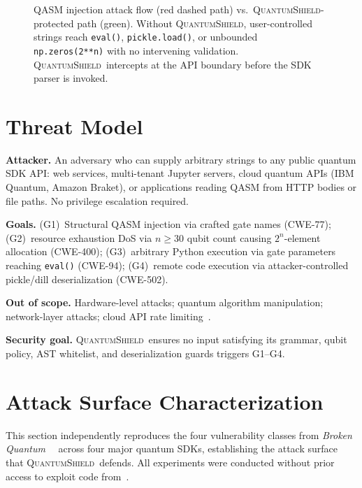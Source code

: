 \documentclass[conference,compsoc]{IEEEtran}
\newcommand{\tool}{\textsc{QuantumShield}}
\newcommand{\broken}{\textit{Broken Quantum}~\cite{blain2026broken}}
\begin{document}
\begin{figure}[!ht]
{}
\caption{QASM injection attack flow (red dashed path) vs.\ \tool-protected
  path (green). Without \tool, user-controlled strings reach
  \texttt{eval()}, \texttt{pickle.load()}, or unbounded
  \texttt{np.zeros(2**n)} with no intervening validation.
  \tool\ intercepts at the API boundary before the SDK parser is invoked.}
\label{fig:attack_flow}
\end{figure}

\section{Threat Model}
\label{sec:threat}
\noindent \textbf{Attacker.}
An adversary who can supply arbitrary strings to any public quantum SDK
API: web services, multi-tenant Jupyter servers, cloud quantum APIs
(IBM Quantum, Amazon Braket), or applications reading QASM from HTTP
bodies or file paths.
No privilege escalation required.

\noindent \textbf{Goals.}
(G1)~Structural QASM injection via crafted gate names (CWE-77);
(G2)~resource exhaustion DoS via $n\!\geq\!30$ qubit count
causing $2^n$-element allocation (CWE-400);
(G3)~arbitrary Python execution via gate parameters reaching
\texttt{eval()} (CWE-94);
(G4)~remote code execution via attacker-controlled pickle/dill
deserialization (CWE-502).

\noindent \textbf{Out of scope.}
Hardware-level attacks; quantum algorithm manipulation;
network-layer attacks; cloud API rate
limiting~\cite{blain2026broken}.

\noindent \textbf{Security goal.}
\tool\ ensures no input satisfying its grammar, qubit policy,
AST whitelist, and deserialization guards triggers G1--G4.

\section{Attack Surface Characterization}
\label{sec:attack}
\noindent This section independently reproduces the four vulnerability
classes from \broken~\cite{blain2026broken} across four major quantum
SDKs, establishing the attack surface that \tool\ defends.
All experiments were conducted without prior access to exploit code
from~\cite{blain2026broken}.
\end{document}
